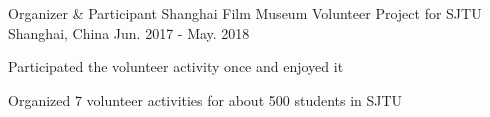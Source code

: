 \begin{cventries}
	\cventry
	{Organizer \& Participant}
	{Shanghai Film Museum Volunteer Project for SJTU}
	{Shanghai, China}
	{Jun. 2017 - May. 2018}
	{
        \begin{cvitems}
            \item {Participated the volunteer activity once and enjoyed it}
			\item {Organized 7 volunteer activities for about 500 students in SJTU}
		\end{cvitems}
    }
\end{cventries}
